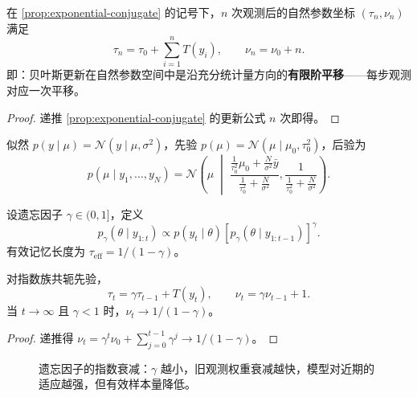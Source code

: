 \begin{corollary}[自然参数空间中的有限阶平移]\label{cor:ps_natural_param_translation}
在 \cref{prop:exponential-conjugate} 的记号下，$n$ 次观测后的自然参数坐标 $(\tau_n,\nu_n)$ 满足
\[
\tau_n = \tau_0 + \sum_{i=1}^n T(y_i), \qquad \nu_n = \nu_0 + n.
\]
即：贝叶斯更新在自然参数空间中是沿充分统计量方向的\textbf{有限阶平移}——每步观测对应一次平移。
\end{corollary}

\begin{proof}
递推 \cref{prop:exponential-conjugate} 的更新公式 $n$ 次即得。
\end{proof}

\begin{example}[高斯--高斯基轭对]\label{ex:gaussian-conjugate}
似然 $p(y\mid\mu)=\mathcal{N}(y\mid\mu,\sigma^2)$，先验 $p(\mu)=\mathcal{N}(\mu\mid\mu_0,\tau_0^2)$，后验为
\[
p(\mu\mid y_1,\dots,y_N)
=\mathcal{N}\left(
\mu\;\middle|\;
\frac{\frac{1}{\tau_0^2}\mu_0+\frac{N}{\sigma^2}\bar{y}}{\frac{1}{\tau_0^2}+\frac{N}{\sigma^2}},
\frac{1}{\frac{1}{\tau_0^2}+\frac{N}{\sigma^2}}
\right).
\]
\end{example}

\begin{definition}[指数遗忘贝叶斯更新]\label{def:forgetting-bayes}
设遗忘因子 $\gamma\in(0,1]$，定义
\[
p_\gamma(\theta\mid y_{1:t})
\propto p(y_t\mid\theta)\left[p_\gamma(\theta\mid y_{1:t-1})\right]^\gamma.
\]
有效记忆长度为 $\tau_{\text{eff}}=1/(1-\gamma)$。
\end{definition}

\begin{proposition}[遗忘对后验精度的影响]\label{prop:forgetting-precision}
对指数族共轭先验，
\[
\tau_t=\gamma\tau_{t-1}+T(y_t),\qquad
\nu_t=\gamma\nu_{t-1}+1.
\]
当 $t\to\infty$ 且 $\gamma<1$ 时，$\nu_t\to1/(1-\gamma)$。
\end{proposition}

\begin{proof}
递推得 $\nu_t=\gamma^t\nu_0+\sum_{j=0}^{t-1}\gamma^j\to1/(1-\gamma)$。
\end{proof}

\begin{figure}[htbp]
\centering
{}
\caption{遗忘因子的指数衰减：$\gamma$ 越小，旧观测权重衰减越快，模型对近期的适应越强，但有效样本量降低。}
\label{fig:ps_forgetting_factor}
\end{figure}

